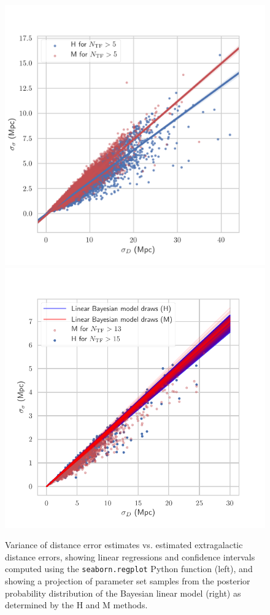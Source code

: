 \documentclass[a4paper,fleqn,usenatbib]{mnras}
\begin{document}
\begin{figure}
	\includegraphics[scale=0.69]{ee.png}
	\includegraphics[scale=0.69]{drawsee}
    \caption{Variance of distance error estimates vs. estimated extragalactic distance errors, showing linear regressions and confidence intervals computed using the \texttt{seaborn.regplot} Python function (left), and showing a projection of parameter set samples from the posterior probability distribution of the Bayesian linear model (right) as determined by the H and M methods.}
    \label{fig:drawsee}
\end{figure}
\end{document}
